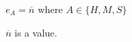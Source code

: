 \begin{case}
$e_{A}=\overline{n}$ where $A\in\lbrace H,M,S\rbrace$

$\overline{n}$ is a value.
\end{case}